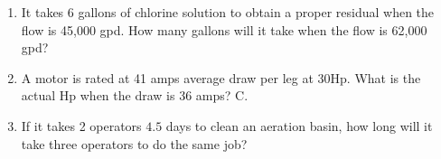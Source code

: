 \begin{enumerate}[1.]




\item It takes 6 gallons of chlorine solution to obtain a proper residual when the flow is 45,000 gpd. How many gallons will it take when the flow is 62,000 gpd?

\item A motor is rated at 41 amps average draw per leg at $30 \mathrm{Hp}$. What is the actual $\mathrm{Hp}$ when the draw is 36 amps? C. 

\item If it takes 2 operators $4.5$ days to clean an aeration basin, how long will it take three operators to do the same job?





\end{enumerate}
